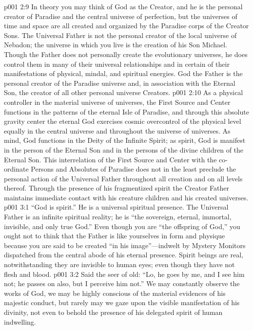 \pc \vs p001 2:9 In theory you may think of God as the Creator, and he is the personal creator of Paradise and the central universe of perfection, but the universes of time and space are all created and organized by the Paradise corps of the Creator Sons. The Universal Father is not the personal creator of the local universe of Nebadon; the universe in which you live is the creation of his Son Michael. Though the Father does not personally create the evolutionary universes, he does control them in many of their universal relationships and in certain of their manifestations of physical, mindal, and spiritual energies. God the Father is the personal creator of the Paradise universe and, in association with the Eternal Son, the creator of all other personal universe Creators.
\pc \vs p001 2:10 As a physical controller in the material universe of universes, the First Source and Center functions in the patterns of the eternal Isle of Paradise, and through this absolute gravity center the eternal God exercises cosmic overcontrol of the physical level equally in the central universe and throughout the universe of universes. As mind, God functions in the Deity of the Infinite Spirit; as spirit, God is manifest in the person of the Eternal Son and in the persons of the divine children of the Eternal Son. This interrelation of the First Source and Center with the co\hyp{}ordinate Persons and Absolutes of Paradise does not in the least preclude the  personal action of the Universal Father throughout all creation and on all levels thereof. Through the presence of his fragmentized spirit the Creator Father maintains immediate contact with his creature children and his created universes.
\vs p001 3:1 “God is spirit.” He is a universal spiritual presence. The Universal Father is an infinite spiritual reality; he is “the sovereign, eternal, immortal, invisible, and only true God.” Even though you are “the offspring of God,” you ought not to think that the Father is like yourselves in form and physique because you are said to be created “in his image”---indwelt by Mystery Monitors dispatched from the central abode of his eternal presence. Spirit beings are real, notwithstanding they are invisible to human eyes; even though they have not flesh and blood.
\vs p001 3:2 Said the seer of old: “Lo, he goes by me, and I see him not; he passes on also, but I perceive him not.” We may constantly observe the works of God, we may be highly conscious of the material evidences of his majestic conduct, but rarely may we gaze upon the visible manifestation of his divinity, not even to behold the presence of his delegated spirit of human indwelling.
